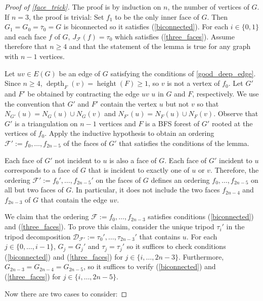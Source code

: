 \documentclass{patmorin}
\DeclareMathOperator{\height}{height}
\DeclareMathOperator{\depth}{depth}
\begin{document}
\begin{proof}[Proof of \cref{face_trick}]
  The proof is by induction on $n$, the number of vertices of $G$.  If $n=3$, the proof is trivial: Set $f_1$ to be the only inner face of $G$.  Then $G_1=G_0=\overline{\tau}_0=G$ is biconnected so it satisfies (\ref{biconnected}).  For each $i\in\{0,1\}$ and each face $f$ of $G$, $J_{\mathcal{F}}(f)=\tau_0$ which satisfies (\ref{three_faces}).  Assume therefore that $n\ge 4$ and that the statement of the lemma is true for any graph with $n-1$ vertices.

  Let $uv\in E(G)$ be an edge of $G$ satisfying the conditions of \cref{good_deep_edge}.  Since $n\ge 4$, $\depth_{F}(v)=\height(F)\ge 1$, so $v$ is not a vertex of $f_0$. Let $G'$ and $F'$ be obtained by contracting the edge $uv$ $u$ in $G$ and $F$, respectively. We use the convention that $G'$ and $F'$ contain the vertex $u$ but not $v$ so that $N_{G'}(u)=N_G(u)\cup N_G(v)$ and $N_{F'}(u)=N_F(u)\cup N_F(v)$.  Observe that $G'$ is a triangulation on $n-1$ vertices and $F$ is a BFS forest of $G'$ rooted at the vertices of $f_0$.   Apply the inductive hypothesis to obtain an ordering $\mathcal{F}':=f_0,\ldots,f_{2n-5}$ of the faces of $G'$ that satisfies the conditions of the lemma.

  Each face of $G'$ not incident to $u$ is also a face of $G$.  Each face of $G'$ incident to $u$ corresponds to a face of $G$ that is incident to exactly one of $u$ or $v$.
  Therefore, the ordering $\mathcal{F}':=f_0',\ldots,f_{2n-5}'$ on the faces of $G$ defines an ordering $f_0,\ldots,f_{2n-5}$ on all but two faces of $G$.  In particular, it does not include the two faces $f_{2n-4}$ and $f_{2n-3}$ of $G$ that contain the edge $uv$.

  We claim that the ordering $\mathcal{F}:=f_0,\ldots,f_{2n-3}$ satisfies conditions (\ref{biconnected}) and (\ref{three_faces}). To prove this claim, consider the unique tripod $\tau_i'$ in the tripod decomposition $\mathcal{D}_{\mathcal{F'}}:=\tau_0',\ldots,\tau_{2n-3}'$ that contains $u$. For each $j\in\{0,\ldots,i-1\}$, $G_j=G_j'$ and $\tau_j=\tau_j'$ so it suffices to check conditions (\ref{biconnected}) and (\ref{three_faces}) for $j\in\{i,\ldots,2n-3\}$. Furthermore, $G_{2n-3}=G_{2n-4}=G_{2n-5}$, so it suffices to verify (\ref{biconnected}) and (\ref{three_faces}) for $j\in\{i,\ldots,2n-5\}$.


  Now there are two cases to consider:


\end{proof}
\end{document}
